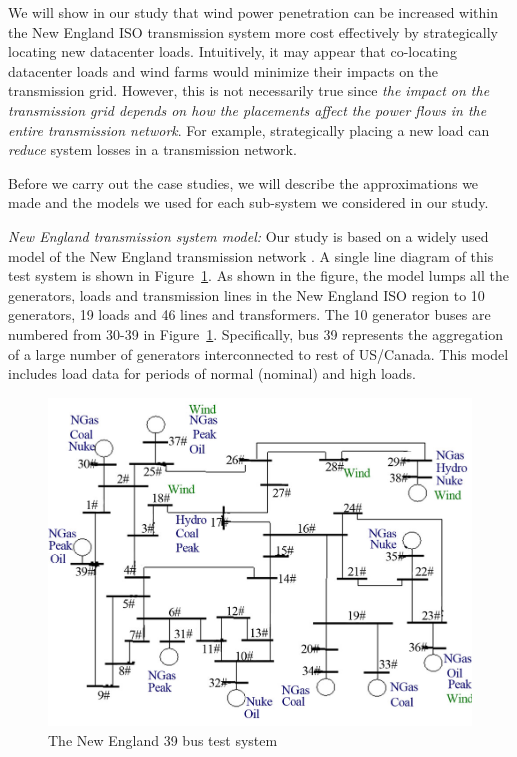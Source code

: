 We will show in our study that wind power penetration can be increased
within the New England ISO transmission system more cost effectively
by strategically locating new datacenter loads. Intuitively, it may
appear that co-locating datacenter loads and wind farms would minimize
their impacts on the transmission grid.  However, this is not
necessarily true since {\em the impact on the transmission grid
  depends on how the placements affect the power flows in the entire
  transmission network}.  For example, strategically placing a new load
can {\em reduce} system losses in a transmission network.

Before we carry out the case studies, we will describe the approximations we made and the models we used for each sub-system we considered in our study.

{\em New England transmission system model:} Our study is based on a
widely used model of the New England transmission network
\cite{bills1970line}. A single line diagram of this test system is
shown in Figure~\ref{fig:newengland}. As shown in the figure, the
model lumps all the generators, loads and transmission lines in the
New England ISO region to 10 generators, 19 loads and 46 lines and
transformers. The 10 generator buses are numbered from 30-39 in
Figure~\ref{fig:newengland}. Specifically, bus 39 represents the
aggregation of a large number of generators interconnected to rest of
US/Canada.  This model includes load data for periods of normal
(nominal) and high loads.

\begin{figure}[ht]
\centering
\includegraphics[width=1\columnwidth]{img/newEngland.jpg}
\caption{The New England 39 bus test system}
\label{fig:newengland}
\end{figure}

